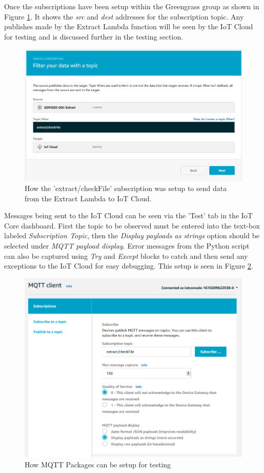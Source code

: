 Once the subscriptions have been setup within the Greengrass group as shown in Figure \ref{fig:setup_subs}. It shows the \textit{src} and \textit{dest} addresses for the subscription topic. Any publishes made by the Extract Lambda function will be seen by the IoT Cloud for testing and is discussed further in the testing section.

\begin{figure}[ht]
    \centering
    \includegraphics[width=0.75\linewidth]{pages/Chapter4/Chapter 4 Images/setting_up_subscription.png}
    \caption{How the 'extract/checkFile' subscription was setup to send data from the Extract Lambda to IoT Cloud.}
    \label{fig:setup_subs}
\end{figure}

Messages being sent to the IoT Cloud can be seen via the 'Test' tab in the IoT Core dashboard. First the topic to be observed must be entered into the text-box labeled \textit{Subscription Topic}, then the \textit{Display payloads as strings} option should be selected under \textit{MQTT payload display}. Error messages from the Python script can also be captured using \textit{Try} and \textit{Except} blocks to catch and then send any exceptions to the IoT Cloud for easy debugging. This setup is seen in Figure \ref{fig:mqqt_testing_setup}.

\begin{figure}[ht]
    \centering
    \includegraphics[width=0.75\linewidth]{pages/Chapter4/Chapter 4 Images/setting_up_mqqt_for_test.png}
    \caption{How MQTT Packages can be setup for testing}
    \label{fig:mqqt_testing_setup}
\end{figure}


